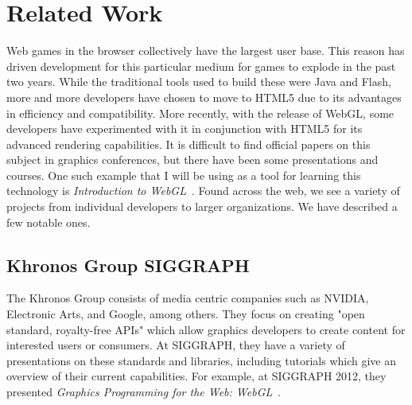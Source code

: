 \documentclass{acmsiggraph}
\begin{document}
\section{Related Work}
Web games in the browser collectively have the largest user base. This reason has driven development for this particular medium for games to explode in the past two years. While the traditional tools used to build these were Java and Flash, more and more developers have chosen to move to HTML5 due to its advantages in efficiency and compatibility. More recently, with the release of WebGL, some developers have experimented with it in conjunction with HTML5 for its advanced rendering capabilities. It is difficult to find official papers on this subject in graphics conferences, but there have been some presentations and courses. One such example that I will be using as a tool for learning this  technology is \emph{Introduction to WebGL}~\cite{J12}. Found across the web, we see a variety of projects from individual developers to larger organizations. We have described a few notable ones.

    \subsection{Khronos Group SIGGRAPH}
    The Khronos Group consists of media centric companies such as NVIDIA, Electronic Arts, and Google, among others. They focus on creating "open standard, royalty-free APIs" which allow graphics developers to create content for interested users or consumers. At SIGGRAPH, they have a variety of presentations on these standards and libraries, including tutorials which give an overview of their current capabilities. For example, at SIGGRAPH 2012, they presented \emph{Graphics Programming for the Web: WebGL}~\cite{RM12}.
\end{document}
